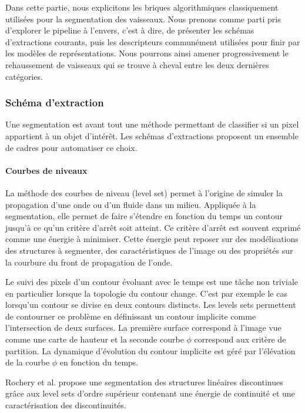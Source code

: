 Dans cette partie, nous explicitons les briques algorithmiques classiquement utilisées pour la segmentation des vaisseaux. Nous prenons comme parti pris d'explorer le pipeline à l'envers, c'est à dire, de présenter les schémas d'extractions courants, puis les descripteurs communément utilisées pour finir par les modèles de représentations. Nous pourrons ainsi amener progressivement le rehaussement de vaisseaux qui se trouve à cheval entre les deux dernières catégories.

\subsubsection{Schéma d'extraction}

Une segmentation est avant tout une méthode permettant de classifier si un pixel appartient à un objet d'intérêt. Les schémas d'extractions proposent un ensemble de cadres pour automatiser ce choix.

\paragraph{Courbes de niveaux}
La méthode des courbes de niveau (level set) permet à l'origine de simuler la propagation d'une onde ou d'un fluide dans un milieu. Appliquée à la segmentation, elle permet de faire s'étendre en fonction du temps un contour jusqu'à ce qu'un critère d'arrêt soit atteint. Ce critère d'arrêt est souvent exprimé comme une énergie à minimiser. Cette énergie peut reposer sur des modélisations des structures à segmenter, des caractéristiques de l'image ou des propriétés sur la courbure du front de propagation de l'onde.

Le suivi des pixels d'un contour évoluant avec le temps est une tâche non triviale en particulier lorsque la topologie du contour change. C'est par exemple le cas lorsqu'un contour se divise en deux contours distincts. Les levels sets permettent de contourner ce problème en définissant un contour implicite comme l'intersection de deux surfaces. La première surface correspond à l'image vue comme une carte de hauteur et la seconde courbe $\phi$ correspond aux critère de partition. La dynamique d'évolution du contour implicite est géré par l'élévation de la courbe $\phi$ en fonction du temps.

Rochery et al. \cite{rochery2006_higher_active_contour} propose une segmentation des structures linéaires discontinues grâce aux level sets d'ordre supérieur contenant une énergie de continuité et une caractérisation des discontinuités. 

